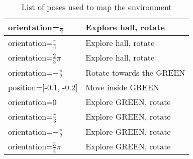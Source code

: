 \begin{appendices}
\begin{table}[H]
\begin{tabular}{|l|l|}
    \hline
    orientation=$\frac{\pi}{2}$ & Explore hall, rotate \\
    \hline
    orientation=$\frac{\pi}{4}$ & Explore hall, rotate \\
    \hline
    orientation=$\frac{2}{3}\pi$ & Explore hall, rotate \\
    \hline
    orientation=$-\frac{\pi}{2}$ & Rotate towards the GREEN \\
    \hline
    position=[-0.1, -0.2] & Move inside GREEN \\
    \hline
    orientation=0 & Explore GREEN, rotate \\
    \hline
    orientation=$\frac{\pi}{3}$ & Explore GREEN, rotate \\
    \hline
    orientation=$-\frac{\pi}{2}$ & Explore GREEN, rotate \\
    \hline
    orientation=$\frac{3}{4}\pi$ & Explore GREEN, rotate \\
    \hline
    \end{tabular}
    \caption{List of poses used to map the environment}
    \label{tab:results:list_of_poses}
\end{table}

\end{appendices}